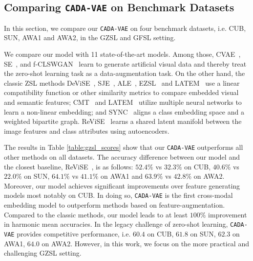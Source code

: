 \documentclass[10pt,twocolumn,letterpaper]{article}
\newcommand{\myparagraph}[1]{\vspace{6pt}\noindent{\bf #1}}
\begin{document}
\subsection{Comparing \textbf{\texttt{CADA-VAE}} on Benchmark Datasets}
In this section, we compare our \texttt{CADA-VAE} on four benchmark datasets, i.e. CUB, SUN, AWA1 and AWA2, in the GZSL and GFSL setting.

\myparagraph{Generalized Zero-Shot Learning.}
We compare our model with 11 state-of-the-art models. Among those, CVAE~\cite{cvae}, SE~\cite{segzsl}, and f-CLSWGAN~\cite{featgen} learn to generate artificial visual data and thereby treat the zero-shot learning task as a data-augmentation task.
On the other hand, the classic ZSL methods DeViSE~\cite{devise}, SJE~\cite{sje}, ALE~\cite{ss}, EZSL~\cite{ezsl} and LATEM~\cite{latem} use a linear compatibility function or other similarity metrics to compare embedded visual and semantic features; CMT~\cite{socher2013zero} and LATEM~\cite{latem} utilize multiple neural networks to learn a non-linear embedding; and SYNC~\cite{sync} aligns a class embedding space and a weighted bipartite graph. ReViSE~\cite{tsai2017learning} learns a shared latent manifold between the image features and class attributes using autoencoders. 

The results in Table \ref{table:gzsl_scores} show that our \texttt{CADA-VAE} outperforms all other methods on all datasets. The accuracy difference between our model and the closest baseline, ReViSE~\cite{tsai2017learning}, is as follows: $52.4\%$ vs $32.3\%$ on CUB, $40.6\%$ vs $22.0\%$ on SUN, $64.1\%$ vs $41.1\%$ on AWA1 and $63.9\%$ vs $42.8\%$ on AWA2. Moreover, our model achieves significant improvements over feature generating models most notably on CUB. In doing so, \texttt{CADA-VAE} is the first cross-modal embedding model to outperform methods based on feature-augmentation. Compared to the classic methods, our model leads to at least $100\%$ improvement in harmonic mean accuracies. In the legacy challenge of zero-shot learning, \texttt{CADA-VAE} provides competitive performance, i.e. $60.4$ on CUB, $61.8$ on SUN, $62.3$ on AWA1, $64.0$ on AWA2. However, in this work, we focus on the more practical and challenging GZSL setting.
\end{document}
